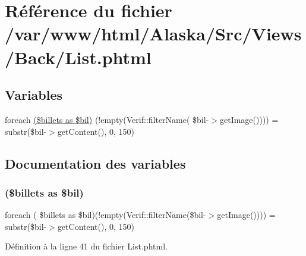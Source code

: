 \hypertarget{_back_2_list_8phtml}{}\section{Référence du fichier /var/www/html/\+Alaska/\+Src/\+Views/\+Back/\+List.phtml}
\label{_back_2_list_8phtml}
\subsection*{Variables}
\begin{DoxyCompactItemize}
\item 
foreach \hyperlink{_back_2_list_8phtml_a8e0c0a104325d525b4080fdfbdc4327a}{(\$billets as \$bil)} (!empty(Verif\+::filter\+Name( \$bil-\/$>$get\+Image()))) = substr(\$bil-\/$>$get\+Content(), 0, 150)
\end{DoxyCompactItemize}


\subsection{Documentation des variables}
\mbox{\label{_back_2_list_8phtml_a8e0c0a104325d525b4080fdfbdc4327a}} 
\subsubsection{\texorpdfstring{(\$billets as \$bil)}{($billets as $bil)}}
{\footnotesize\ttfamily foreach ( \$billets as \$bil)(!empty(Verif\+::filter\+Name(\$bil-\/$>$get\+Image()))) = substr(\$bil-\/$>$get\+Content(), 0, 150)}



Définition à la ligne 41 du fichier List.\+phtml.

